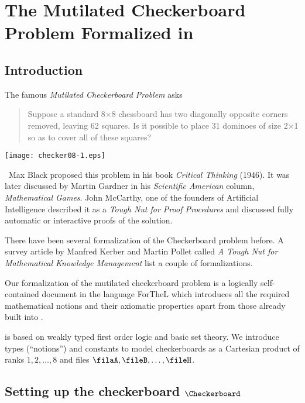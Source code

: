 \section{The Mutilated Checkerboard Problem Formalized in \Naproche{}}



\subsection{Introduction}

The famous {\emph{Mutilated Checkerboard Problem}} asks

\begin{quotation}
  Suppose a standard 8$\times$8 chessboard has two diagonally opposite corners
  removed, leaving 62 squares. Is it possible to place 31 dominoes of size
  2$\times$1 so as to cover all of these squares?
\end{quotation}

\begin{center}
  {\texttt{[image: checker08-1.eps]}}
\end{center}

\
Max Black proposed this problem in his book
\textit{Critical Thinking} (1946).
%
It was later discussed by Martin Gardner in his
\textit{Scientific American} column, \textit{Mathematical Games}.
%
John McCarthy, one of the
founders of Artificial Intelligence described it as a
\textit{Tough Nut for Proof Procedures}
and discussed fully automatic or interactive proofs of the solution.

There have been several formalization of the Checkerboard problem before. A
survey article by Manfred Kerber and Martin Pollet called {\emph{A Tough Nut
for Mathematical Knowledge Management}} list a couple of formalizations.

Our formalization of the mutilated checkerboard problem is a logically
self-contained document in the language ForTheL which introduces all the
required mathematical notions and their axiomatic properties apart from those
already built into \Naproche{}.

\Naproche{} is based on weakly typed first order logic and basic set
theory. We introduce types (``notions'') and constants to model checkerboards
as a Cartesian product of ranks $1, 2, \ldots, 8$ and files $\filaA, \fileB, \ldots, \fileH$.



\subsection{Setting up the checkerboard $\Checkerboard$}

